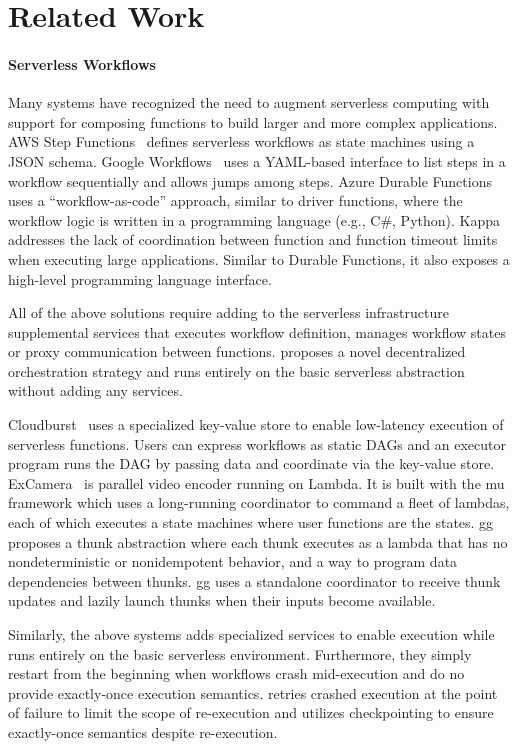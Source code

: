 \section{Related Work}\label{sec:related}

\paragraph{Serverless Workflows}

Many systems have recognized the need to augment serverless computing with
support for composing functions to build larger and more complex applications.
AWS Step Functions~\cite{aws-step-functions} defines serverless workflows as
state machines using a JSON schema. Google Workflows~\cite{google-workflows}
uses a YAML-based interface to list steps in a workflow sequentially and
allows jumps among steps. Azure Durable Functions~\cite{durable-functions}
uses a ``workflow-as-code'' approach, similar to driver functions, where the
workflow logic is written in a programming language (e.g., C\#, Python).
Kappa~\cite{kappa} addresses the lack of coordination between function and
function timeout limits when executing large applications. Similar to Durable
Functions, it also exposes a high-level programming language interface.

All of the above solutions require adding to the serverless infrastructure
supplemental services that executes workflow definition, manages workflow
states or proxy communication between functions. \name{} proposes a novel
decentralized orchestration strategy and runs entirely on the basic serverless
abstraction without adding any services.

Cloudburst~\cite{cloudburst} uses a specialized key-value store to enable
low-latency execution of serverless functions. Users can express workflows as
static DAGs and an executor program runs the DAG by passing data and
coordinate via the key-value store. ExCamera~\cite{excamera} is parallel video
encoder running on Lambda. It is built with the mu framework which uses a
long-running coordinator to command a fleet of lambdas, each of which executes
a state machines where user functions are the states. gg~\cite{gg-atc}
proposes a thunk abstraction where each thunk executes as a lambda that has no
nondeterministic or nonidempotent behavior, and a way to program data
dependencies between thunks. gg uses a standalone coordinator to receive thunk
updates and lazily launch thunks when their inputs become available.

Similarly, the above systems adds specialized services to enable execution
while \name{} runs entirely on the basic serverless environment. Furthermore,
they simply restart from the beginning when workflows crash mid-execution and
do no provide exactly-once execution semantics. \name{} retries crashed
execution at the point of failure to limit the scope of re-execution and
utilizes checkpointing to ensure exactly-once semantics despite re-execution.

